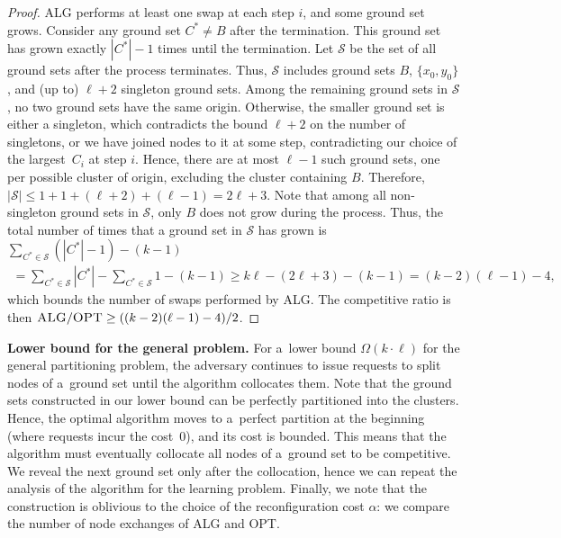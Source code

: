 \documentclass[a4paper,anonymous,USenglish]{lipics-v2019}
\newcommand{\OPT}{\textsc{OPT}\xspace}
\newcommand{\ALG}{\textsc{ALG}\xspace}
\begin{document}
\begin{proof}
	\ALG performs at least one swap at each step $i$,
	and some ground set grows.
	Consider any ground set $C^* \neq B$ after the termination.
	This ground set has grown exactly $|C^*|-1$ times until the termination. 
	Let $\mathcal{S}$ be the set of all ground sets after the process terminates.
	Thus, $\mathcal{S}$ includes ground sets $B$,
	$\{x_0,y_0\}$,
	and (up to) $\ell+2$ singleton ground sets.
	Among the remaining ground sets in $\mathcal{S}$,
	no two ground sets have the same origin.
	Otherwise,
   the smaller ground set is either a singleton,
   which contradicts the bound $\ell+2$ on the number of singletons,
	or we have joined nodes to it at some step,
	contradicting our choice of the largest~$C_i$ at step $i$.
	Hence,  there are at most $\ell-1$ such ground sets,
	one per possible cluster of origin,
	 excluding the cluster containing $B$. 
	Therefore,  $|\mathcal{S}| \leq 1 + 1 + (\ell+2)  + (\ell-1) = 2\ell+3$.
	Note that among all non-singleton ground sets in $\mathcal{S}$,
	 only $B$ does not grow during the process.
	 Thus,
    the total number of times that 
	a ground set in $\mathcal{S}$  has grown is
	$	\sum_{C^* \in \mathcal{S} } (|C^*|-1) - (k-1) $
	\begin{align*}
	=\sum_{C^* \in \mathcal{S} } |C^*| - 
		\sum_{C^* \in \mathcal{S} } 1 - (k-1) 
	\geq  k  \ell - (2\ell+3) - (k-1) =  (k-2)(\ell-1) - 4,
	\end{align*}
	which bounds the number of swaps performed by \ALG.
	The competitive ratio is then
	$\ALG / \OPT \geq ((k-2)(\ell-1) - 4) / 2$.
	\begin{comment}
	\ALG performs at least one swap  every time   a~ground set is constructed.
	Each expansion reduces the number of isolated nodes by $1$ or $2$.
	The decrease of two isolated nodes occurs when the largest component on  $I(x_i)$ is still singleton; this occurs at most $\ell$ times.
	We start with $k \cdot \ell - (k-1)$ isolated nodes (a~single $k-1$ ground set is revealed prior to $\{x_0, y_0\}$), and we end with isolated $\ell+1$ nodes.
	Hence, the total number of swaps of \ALG is at least $k\cdot \ell - k - 2 \ell$.
	The competitive ratio is then $\ALG / \OPT \geq (k\cdot \ell - k - 2\ell) / 2$.
	\end{comment}
\end{proof}

\noindent
\textbf{Lower bound for the general problem.}
For a~lower bound $\Omega(k\cdot \ell)$ for the general partitioning problem, the adversary continues to issue requests to split nodes of a~ground set until the algorithm collocates them.
Note that the ground sets constructed in our lower bound can be perfectly partitioned into the clusters.
Hence, the optimal algorithm moves to a~perfect partition at the beginning (where requests incur the cost~$0$), and its cost is bounded.
This means that the algorithm must eventually collocate all nodes of a~ground set to be competitive.
We reveal the next ground set only after the collocation, hence we can repeat the analysis of the algorithm for the learning problem.
Finally, we note that the construction is oblivious to the choice of the reconfiguration cost $\alpha$: we compare the 	number of node exchanges of \ALG and \OPT.
\end{document}
